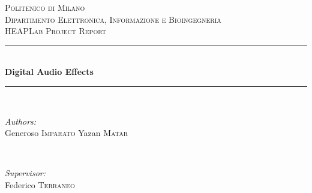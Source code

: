 \begin{titlepage}

\newcommand{\HRule}{\rule{\linewidth}{0.5mm}} %

\center %
 

\textsc{\LARGE Politenico di Milano}\\[1.5cm] %
\textsc{\Large Dipartimento Elettronica, Informazione e Bioingegneria}\\[0.5cm] %
\textsc{\large HEAPLab Project Report}\\[0.5cm] %


\HRule \\[0.4cm]
{ \huge \bfseries Digital Audio Effects}\\[0.4cm] %
\HRule \\[1.5cm]
 

\begin{minipage}{0.4\textwidth}
\begin{flushleft} \large
\emph{Authors:}\\
Generoso \textsc{Imparato} \newline
Yazan \textsc{Matar}
\end{flushleft}
\end{minipage}
~
\begin{minipage}{0.4\textwidth}
\begin{flushright} \large
\emph{Supervisor:} \\
Federico \textsc{Terraneo} %
\end{flushright}
\end{minipage}\\[2cm]


\end{titlepage}
